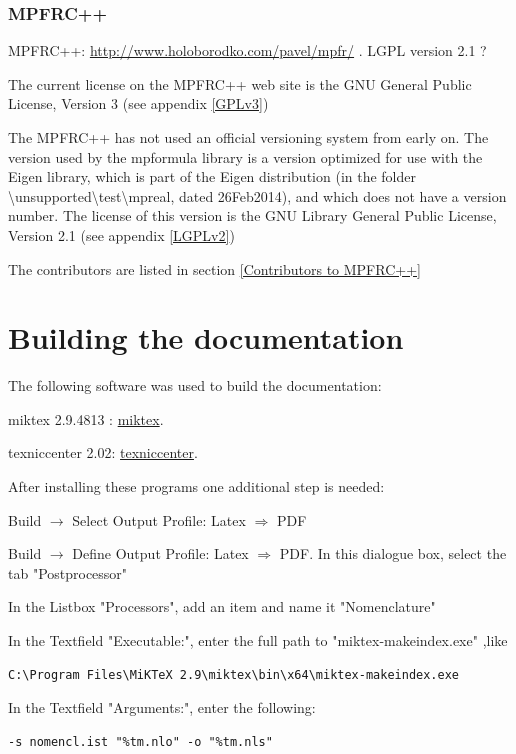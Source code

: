 \subsubsection{MPFRC++}
MPFRC++: \href{http://www.holoborodko.com/pavel/mpfr/}{http://www.holoborodko.com/pavel/mpfr/} . LGPL version 2.1 ?

The current license on the MPFRC++ web site is the GNU General Public License, Version 3 (see appendix \ref{GPLv3})

The MPFRC++ has not used an official versioning system from early on. The version used by the mpformula library is a version optimized for use with the Eigen library, which is part of the Eigen distribution (in the folder \textbackslash unsupported\textbackslash test\textbackslash mpreal, dated 26Feb2014), and which does not have a version number. The license of this version is the GNU Library General Public License, Version 2.1 (see appendix \ref{LGPLv2})

The contributors are listed in section \ref{Contributors to MPFRC++}



\newpage
\section{Building the documentation}
The following software was used to build the documentation:

miktex 2.9.4813 : \href{http://miktex.org/}{miktex}.

texniccenter 2.02: \href{http://www.texniccenter.org/}{texniccenter}.

After installing these programs one additional step is needed: 

Build $\rightarrow$ Select Output Profile: Latex $\Rightarrow$ PDF

Build $\rightarrow$ Define Output Profile: Latex $\Rightarrow$ PDF. In this dialogue box, select the tab "Postprocessor"

In the Listbox "Processors", add an item and name it "Nomenclature"

In the Textfield "Executable:", enter the full path to "miktex-makeindex.exe" ,like 
\begin{verbatim}
C:\Program Files\MiKTeX 2.9\miktex\bin\x64\miktex-makeindex.exe
\end{verbatim}
In the Textfield "Arguments:", enter the following:
\begin{verbatim}
-s nomencl.ist "%tm.nlo" -o "%tm.nls"
\end{verbatim}




